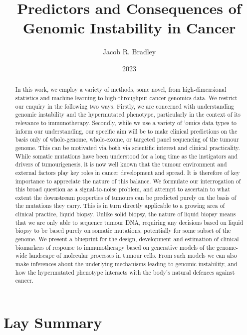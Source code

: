 \documentclass[10pt,twoside,openright]{report}
\title{Predictors and Consequences of Genomic Instability in Cancer}
\author{Jacob R. Bradley}
\date{2023}
\begin{document}
\maketitle

\declaration

\dedication{To Morton...}

\begin{abstract}
In this work, we employ a variety of methods, some novel, from high-dimensional statistics and machine learning to high-throughput cancer genomics data. We restrict our enquiry in the following two ways. Firstly, we are concerned with understanding genomic instability and the hypermutated phenotype, particularly in the context of its relevance to immunotherapy. Secondly, while we use a variety of 'omics data types to inform our understanding, our specific aim will be to make clinical predictions on the basis only of whole-genome, whole-exome, or targeted panel sequencing of the tumour genome. This can be motivated via both via scientific interest and clinical practicality. While somatic mutations have been understood for a long time as the instigators and drivers of tumourigenesis, it is now well known that the tumour environment and external factors play key roles in cancer development and spread. It is therefore of key importance to appreciate the nature of this balance. We formulate our interrogation of this broad question as a signal-to-noise problem, and attempt to ascertain to what extent the downstream properties of tumours can be predicted purely on the basis of the mutations they carry. This is in turn directly applicable to a growing area of clinical practice, liquid biopsy. Unlike solid biopsy, the nature of liquid biopsy means that we are only able to sequence tumour DNA, requiring any decisions based on liquid biopsy to be based purely on somatic mutations, potentially for some subset of the genome. We present a blueprint for the design, development and estimation of clinical biomarkers of response to immunotherapy based on generative models of the genome-wide landscape of molecular processes in tumour cells. From such models we can also make inferences about the underlying mechanisms leading to genomic instability, and how the hypermutated phenotype interacts with the body's natural defences against cancer. 
\end{abstract}


\chapter*{Lay Summary}
\label{chap:laysummary}
\end{document}
